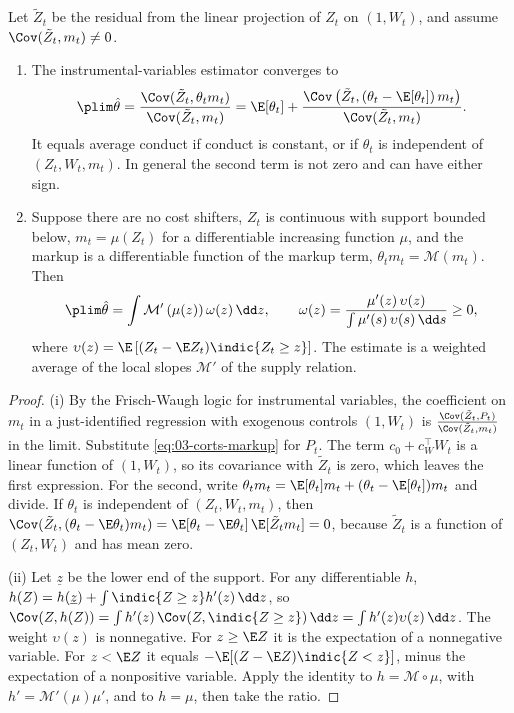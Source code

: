 \begin{proposition}\label{prop:03-corts}
Let $\tilde Z_t$ be the residual from the linear projection of $Z_t$ on $(1, W_t)$, and assume $\Cov(\tilde Z_t, m_t) \neq 0$.
\begin{enumerate}[label=(\roman*)]
\item The instrumental-variables estimator converges to
  \begin{equation}\label{eq:03-corts-estimand}
  \plim \hat\theta = \frac{\Cov(\tilde Z_t, \theta_t m_t)}{\Cov(\tilde Z_t, m_t)}
  = \E[\theta_t] + \frac{\Cov\left(\tilde Z_t, (\theta_t - \E[\theta_t])\, m_t\right)}{\Cov(\tilde Z_t, m_t)} .
  \end{equation}
  It equals average conduct if conduct is constant, or if $\theta_t$ is independent of $(Z_t, W_t, m_t)$. In general the
  second term is not zero and can have either sign.
\item Suppose there are no cost shifters, $Z_t$ is continuous with support bounded below, $m_t = \mu(Z_t)$ for a
  differentiable increasing function $\mu$, and the markup is a differentiable function of the markup term,
  $\theta_t m_t = \mathcal{M}(m_t)$. Then
  \begin{equation*}
  \plim \hat\theta = \int \mathcal{M}'\left(\mu(z)\right) \omega(z)\, \dd z, \qquad
  \omega(z) = \frac{\mu'(z)\, \upsilon(z)}{\int \mu'(s)\, \upsilon(s)\, \dd s} \ge 0,
  \end{equation*}
  where $\upsilon(z) = \E\left[(Z_t - \E Z_t)\indic\{Z_t \ge z\}\right]$.
  The estimate is a weighted average of the local slopes $\mathcal{M}'$ of the supply relation.
\end{enumerate}
\end{proposition}

\begin{proof}
(i) By the Frisch-Waugh logic for instrumental variables, the coefficient on $m_t$ in a just-identified regression with
exogenous controls $(1, W_t)$ is $\frac{\Cov(\tilde Z_t, P_t)}{\Cov(\tilde Z_t, m_t)}$ in the limit. Substitute
\eqref{eq:03-corts-markup} for $P_t$. The term $c_0 + c_W^\top W_t$ is a linear function of $(1, W_t)$, so its
covariance with $\tilde Z_t$ is zero, which leaves the first expression. For the second, write $\theta_t m_t =
\E[\theta_t] m_t + (\theta_t - \E[\theta_t]) m_t$ and divide. If $\theta_t$ is independent of $(Z_t, W_t, m_t)$, then
$\Cov(\tilde Z_t, (\theta_t - \E\theta_t)m_t) = \E[\theta_t - \E\theta_t]\,\E[\tilde Z_t m_t] = 0$, because $\tilde Z_t$ is
a function of $(Z_t, W_t)$ and has mean zero.

(ii) Let $\underline z$ be the lower end of the support. For any differentiable $h$, $h(Z) = h(\underline z) +
\int \indic\{Z \ge z\} h'(z)\, \dd z$, so $\Cov(Z, h(Z)) = \int h'(z)\,\Cov(Z, \indic\{Z \ge z\})\, \dd z = \int h'(z)\upsilon(z)\,
\dd z$. The weight $\upsilon(z)$ is nonnegative. For $z \ge \E Z$ it is the expectation of a nonnegative variable. For
$z < \E Z$ it equals $-\E[(Z - \E Z)\indic\{Z < z\}]$, minus the expectation of a nonpositive variable. Apply the identity
to $h = \mathcal{M} \circ \mu$, with $h' = \mathcal{M}'(\mu)\mu'$, and to $h = \mu$, then take the ratio.
\end{proof}

